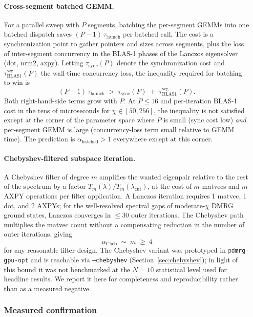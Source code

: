 \documentclass[preprint,12pt]{elsarticle}
\begin{document}
\paragraph{Cross-segment batched GEMM.}
For a parallel sweep with $P$ segments, batching the per-segment GEMMs into one batched dispatch saves $(P{-}1)\,\tau_\text{launch}$ per batched call.
The cost is a synchronization point to gather pointers and sizes across segments, plus the loss of inter-segment concurrency in the BLAS-1 phases of the Lanczos eigensolver (dot, nrm2, axpy).
Letting $\tau_\text{sync}(P)$ denote the synchronization cost and $\tau_\text{BLAS1}^\text{seg}(P)$ the wall-time concurrency loss, the inequality required for batching to win is
\[
(P{-}1)\,\tau_\text{launch} \;>\; \tau_\text{sync}(P) \;+\; \tau_\text{BLAS1}^\text{seg}(P).
\]
Both right-hand-side terms grow with $P$.
At $P \le 16$ and per-iteration BLAS-1 cost in the tens of microseconds for $\chi \in [50, 256]$, the inequality is not satisfied except at the corner of the parameter space where $P$ is small (sync cost low) \emph{and} per-segment GEMM is large (concurrency-loss term small relative to GEMM time).
The prediction is $\alpha_\text{batched} > 1$ everywhere except at this corner.

\paragraph{Chebyshev-filtered subspace iteration.}
A Chebyshev filter of degree $m$ amplifies the wanted eigenpair relative to the rest of the spectrum by a factor $T_m(\lambda)/T_m(\lambda_\text{cut})$, at the cost of $m$ matvecs and $m$ AXPY operations per filter application.
A Lanczos iteration requires 1 matvec, 1 dot, and 2 AXPYs; for the well-resolved spectral gaps of moderate-$\chi$ DMRG ground states, Lanczos converges in $\le 30$ outer iterations.
The Chebyshev path multiplies the matvec count without a compensating reduction in the number of outer iterations, giving
\[
\alpha_\text{Cheb} \;\sim\; m \;\geq\; 4
\]
for any reasonable filter design.
The Chebyshev variant was prototyped in \texttt{pdmrg-gpu-opt} and is reachable via \texttt{--chebyshev} (Section~\ref{sec:chebyshev}); in light of this bound it was not benchmarked at the $N{=}10$ statistical level used for headline results.
We report it here for completeness and reproducibility rather than as a measured negative.

\subsubsection{Measured confirmation}
\label{sec:opt_measured}
\end{document}
